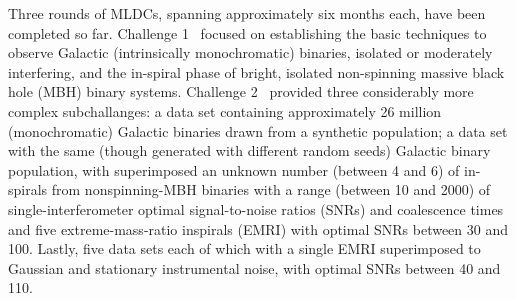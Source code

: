 \documentclass{iopart}
\begin{document}

Three rounds of MLDCs, spanning approximately six months each, have been completed so far. Challenge 1~\cite{mldclisasymp,mldcgwdaw1} focused on establishing the basic techniques to observe Galactic (intrinsically monochromatic) binaries, isolated or moderately interfering, and the in-spiral phase of bright, isolated non-spinning massive black hole (MBH) binary systems. Challenge 2~\cite{mldcgwdaw2} provided three considerably more complex subchallanges: a data set containing approximately 26 million (monochromatic) Galactic binaries drawn from a synthetic population; a data set with the same (though generated with different random seeds) Galactic binary population, with superimposed an unknown number (between 4 and 6) of in-spirals from nonspinning-MBH binaries with a range (between 10 and 2000) of single-interferometer optimal signal-to-noise ratios (SNRs) and coalescence times and five extreme-mass-ratio inspirals (EMRI) with optimal SNRs between 30 and 100. Lastly, five data sets each of which with a single EMRI superimposed to Gaussian and stationary instrumental noise, with optimal SNRs between 40 and 110.

\end{document}
